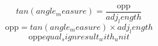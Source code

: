 \[tan({angle_measure})=\frac{{\text{{{opp}}}}}{{{adj_length}}}\]
\[\text{{{opp}}}=tan({angle_measure})\times {adj_length}\]
\[\text{{{opp}}}{equal_sign}{result_with_unit}\]
